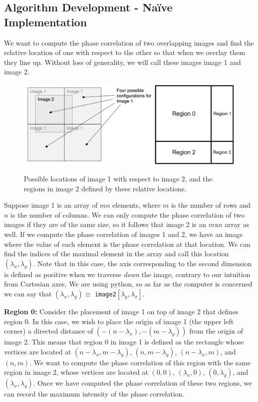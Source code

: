 \documentclass[]{article}
\begin{document}
\subsection{Algorithm Development - Na\"ive Implementation}
We want to compute the phase correlation of two overlapping images and find the relative location of one with respect to the other so that when we overlay them they line up. Without loss of generality, we will call these images image 1 and image 2.
\begin{figure}[H]
	\centering
	\includegraphics[width=6.75in]{images/region.png}
	\label{regions}
	\caption{Possible locations of image 1 with respect to image 2, and the regions in image 2 defined by these relative locations.}
\end{figure}
Suppose image 1 is an array of $mn$ elements, where $m$ is the number of rows and $n$ is the number of columns. We can only compute the phase correlation of two images if they are of the same size, so it follows that image 2 is an $m$x$n$ array as well. If we compute the phase correlation of images 1 and 2, we have an image where the value of each element is the phase correlation at that location. We can find the indices of the maximal element in the array and call this location $(\lambda _x, \lambda _y)$. Note that in this case, the axis corresponding to the second dimension is defined as positive when we traverse \emph{down} the image, contrary to our intuition from Cartesian axes. We are using python, so as far as the computer is concerned we can say that $(\lambda _x, \lambda _y)\equiv$ \texttt{image2}$[\lambda _y,\lambda _x]$.

\vskip 5pt

\textbf{Region 0:} Consider the placement of image 1 on top of image 2 that defines region 0. In this case, we wish to place the origin of image 1 (the upper left corner) a directed distance of $(-{(n-\lambda _x)},-{(m-\lambda _y)})$ from the origin of image 2. This means that region 0 in image 1 is defined as the rectangle whose vertices are located at $(n-\lambda _x,m-\lambda _y)$, $(n,m-\lambda _y)$, $(n-\lambda_x,m)$, and $(n,m)$. We want to compute the phase correlation of this region with the same region in image 2, whose vertices are located at $(0,0)$, $(\lambda_x,0)$, $(0,\lambda_y)$, and $(\lambda_x,\lambda_y)$. Once we have computed the phase correlation of these two regions, we can record the maximum intensity of the phase correlation.
\end{document}
